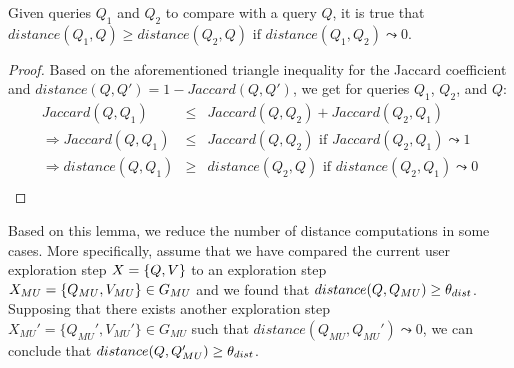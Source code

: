\begin{lemma}
\label{def1}
Given queries $Q_{1}$ and $Q_{2}$ to compare with a query $Q$, it is true that
$distance(Q_{1},Q) \geq distance(Q_2,Q)  \text{ if } distance(Q_{1},Q_{2})   \leadsto 0$.
\end{lemma}


\begin{proof}
Based on the aforementioned triangle inequality for the Jaccard coefficient and $distance(Q,Q') = 1 - Jaccard(Q, Q')$,  we get for queries $Q_{1}$, $Q_{2}$, and  $Q$:
\vspace{-0.3cm}
\begin{eqnarray*}
Jaccard(Q,Q_{1}) &  \leq  &  Jaccard(Q,Q_{2}) + Jaccard(Q_{2},Q_{1})\\
\Rightarrow Jaccard(Q,Q_{1}) & \leq & Jaccard(Q, Q_2) \text{ if } Jaccard(Q_2,Q_{1})  \leadsto 1\\
\Rightarrow distance(Q,Q_{1})&  \geq &  distance(Q_2, Q)   \text{ if } distance(Q_2,Q_{1})  \leadsto 0\\
\end{eqnarray*}
\end{proof}
Based on this lemma, we reduce the number of distance computations in some cases. More specifically, assume that we have compared the current user exploration step $X=\{Q,V\}$ to an exploration step $X_{MU} = \{Q_{MU}, V_{MU}\} \in G_{MU}{}$ and we found that $distance(Q,Q_{MU}) \geq \theta_{dist}$. Supposing that there exists another exploration step $X_{MU}'=\{Q_{MU}', V_{MU}'\} \in G_{MU}$ such that $ distance(Q_{MU},Q_{MU}') \leadsto 0$, we can conclude that $distance(Q, Q_{MU}') \geq \theta_{dist}$.


%


